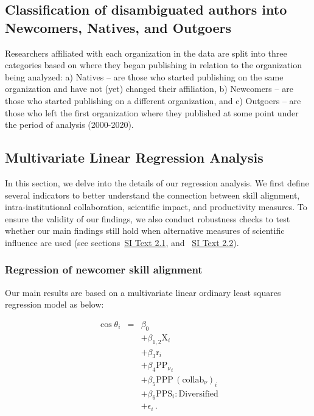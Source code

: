 \documentclass[draft,final]{vutinfth} %
\begin{document}
\subsection{Classification of disambiguated authors into Newcomers, Natives, and Outgoers~\label{SI2}}
Researchers affiliated with each organization in the data are split into three categories based on where they began publishing in relation to the organization being analyzed: a) Natives -- are those who started publishing on the same organization and have not (yet) changed their affiliation, b) Newcomers -- are those who started publishing on a different organization, and c) Outgoers -- are those who left the first organization where they published at some point under the period of analysis (2000-2020). 

\subsection{Multivariate Linear Regression Analysis~\label{SI4}} 
In this section, we delve into the details of our regression analysis. We first define several indicators to better understand the connection between skill alignment, intra-institutional collaboration, scientific impact, and productivity measures. To ensure the validity of our findings, we also conduct robustness checks to test whether our main findings still hold when alternative measures of scientific influence are used (see sections~\hyperref[SI4.1]{SI Text 2.1}, and ~\hyperref[SI4.2]{SI Text 2.2}).

\subsubsection{Regression of newcomer skill alignment~\label{SI4.1}}
Our main results are based on a multivariate linear ordinary least squares regression model as below:

\begin{equation} \label{equation 7}
\begin{array}{lcl}
{\cos \theta}_{i} &=& \beta_0\\
&& + \beta_{1,2} {\mathrm{X}}_{i}\\
&& + \beta_{3} {\mathrm{r}}_{i}\\
&& + \beta_{4} {\mathrm{PP}_{\nu}}_{i}\\
&& + \beta_{5} {\mathrm{PPP}\,(\mathrm{collab}_{\nu})_{i}}\\
&& + \beta_{6} {\mathrm{PPS}_{i}: \mathrm{Diversified}}\\
&& + \epsilon_i \, .\\
\end{array}
\end{equation} 
\end{document}
